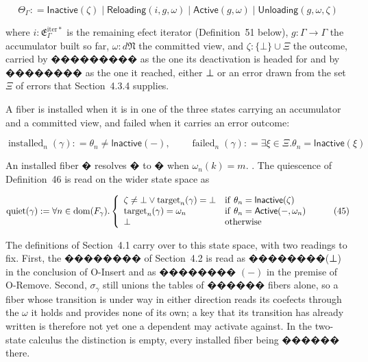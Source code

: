 \documentclass[
  10
]{article}
\newcounter{none} %
\begin{document}
\[
\Theta _ { \Gamma } : = \mathsf { I n a c t i v e } ( \zeta ) \mid \mathsf { R e l o a d i n g } ( i , g , \omega ) \mid \mathsf { A c t i v e } ( g , \omega ) \mid \mathsf { U n l o a d i n g } ( g , \omega , \zeta )\tag{43}
\]

where \(i : \mathfrak { E } _ { \Gamma } ^ { \mathrm { i t e r * } }\)
is the remaining efect iterator (Definition~51 below),
\(g : \Gamma \to \Gamma\) the accumulator built so far,
\(\omega : d  \mathfrak { N }\) the committed view, and
\(\zeta : \{ \bot \} \cup \Xi\) the outcome, carried by ��������� as the
one its deactivation is headed for and by �������� as the one it
reached, either ⊥ or an error drawn from the set \(\Xi\) of errors that
Section~4.3.4 supplies.

A fiber is installed when it is in one of the three states carrying an
accumulator and a committed view, and failed when it carries an error
outcome:

\[
\operatorname { i n s t a l l e d } _ { n } ( \gamma ) : = \theta _ { n } \neq \mathsf { l n a c t i v e } ( - ) , \qquad \operatorname { f a i l e d } _ { n } ( \gamma ) : = \exists \xi \in \Xi . \theta _ { n } = \mathsf { l n a c t i v e } ( \xi )\tag{44}
\]

An installed fiber � resolves � to � when \(\omega _ { n } ( k ) = m .\)
. The quiescence of Definition~46 is read on the wider state space as

\[
\mathrm { q u i e t } ( \gamma ) : = \forall n \in \mathrm { d o m } ( F _ { \gamma } ) . \left\{ \begin{array} { l l } { \zeta \neq \bot \vee \mathrm { t a r g e t } _ { n } ( \gamma ) = \bot } & { \mathrm { i f ~ } \theta _ { n } = \mathsf { l n a c t i v e } ( \zeta ) } \\ { \mathrm { t a r g e t } _ { n } ( \gamma ) = \omega _ { n } } & { \mathrm { i f ~ } \theta _ { n } = \mathsf { A c t i v e } ( - , \omega _ { n } ) \ } \\ { \bot } & { \mathrm { o t h e r w i s e } } \end{array} \right.\tag{45}
\]

The definitions of Section~4.1 carry over to this state space, with two
readings to fix. First, the �������� of Section~4.2 is read as
��������(⊥) in the conclusion of O-Insert and as �������� \(( - )\) in
the premise of O-Remove. Second, \(\sigma _ { \gamma }\) still unions
the tables of ������ fibers alone, so a fiber whose transition is under
way in either direction reads its coefects through the \(\omega\) it
holds and provides none of its own; a key that its transition has
already written is therefore not yet one a dependent may activate
against. In the two-state calculus the distinction is empty, every
installed fiber being ������ there.
\end{document}
